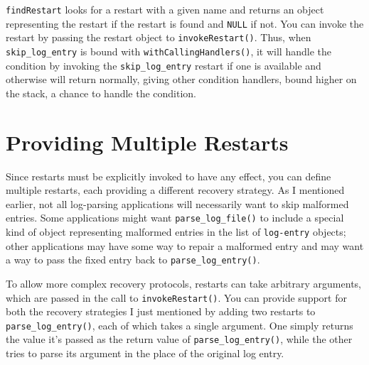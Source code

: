 \texttt{findRestart} looks for a restart with a given name and returns
an object representing the restart if the restart is found and
\texttt{NULL} if not. You can invoke the restart by passing the restart
object to \texttt{invokeRestart()}. Thus, when \texttt{skip\_log\_entry}
is bound with \texttt{withCallingHandlers()}, it will handle the
condition by invoking the \texttt{skip\_log\_entry} restart if one is
available and otherwise will return normally, giving other condition
handlers, bound higher on the stack, a chance to handle the condition.

\hypertarget{providing-multiple-restarts}{%
\section{Providing Multiple
Restarts}\label{providing-multiple-restarts}}

Since restarts must be explicitly invoked to have any effect, you can
define multiple restarts, each providing a different recovery strategy.
As I mentioned earlier, not all log-parsing applications will
necessarily want to skip malformed entries. Some applications might want
\texttt{parse\_log\_file()} to include a special kind of object
representing malformed entries in the list of \texttt{log-entry}
objects; other applications may have some way to repair a malformed
entry and may want a way to pass the fixed entry back to
\texttt{parse\_log\_entry()}.

To allow more complex recovery protocols, restarts can take arbitrary
arguments, which are passed in the call to \texttt{invokeRestart()}. You
can provide support for both the recovery strategies I just mentioned by
adding two restarts to \texttt{parse\_log\_entry()}, each of which takes
a single argument. One simply returns the value it's passed as the
return value of \texttt{parse\_log\_entry()}, while the other tries to
parse its argument in the place of the original log entry.

\begin{Shaded}
\begin{Highlighting}[]
\StringTok{ }
  \NormalTok{ (}
    \NormalTok{(}
\NormalTok{  \}}
  
  \NormalTok{(}
    \NormalTok{(}
     
     
\NormalTok{  )}
\NormalTok{\}}
\end{Highlighting}
\end{Shaded}


